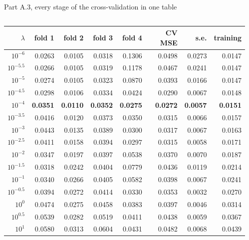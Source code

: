 \documentclass[10pt,aspectratio=169]{beamer}
\begin{document}
\begin{frame}{Part A.3, every stage of the cross-validation in one table}
\begin{columns}[T]
\begin{column}{0.66\textwidth}
\centering
{\fontsize{6.2}{7.0}\selectfont
\begin{tabular}{@{}rrrrrrrr@{}}
\toprule
$\lambda$ & fold 1 & fold 2 & fold 3 & fold 4 & CV MSE & s.e. & training \\
\midrule
$10^{-6}$ & 0.0263 & 0.0105 & 0.0318 & 0.1306 & 0.0498 & 0.0273 & 0.0147 \\
$10^{-5.5}$ & 0.0266 & 0.0105 & 0.0319 & 0.1178 & 0.0467 & 0.0241 & 0.0147 \\
$10^{-5}$ & 0.0274 & 0.0105 & 0.0323 & 0.0870 & 0.0393 & 0.0166 & 0.0147 \\
$10^{-4.5}$ & 0.0298 & 0.0106 & 0.0334 & 0.0424 & 0.0290 & 0.0067 & 0.0148 \\  %
\textbf{$10^{-4}$} & \textbf{0.0351} & \textbf{0.0110} & \textbf{0.0352} & \textbf{0.0275} & \textbf{0.0272} & \textbf{0.0057} & \textbf{0.0151} \\  %
$10^{-3.5}$ & 0.0416 & 0.0120 & 0.0373 & 0.0350 & 0.0315 & 0.0066 & 0.0157 \\  %
$10^{-3}$ & 0.0443 & 0.0135 & 0.0389 & 0.0300 & 0.0317 & 0.0067 & 0.0163 \\  %
$10^{-2.5}$ & 0.0411 & 0.0158 & 0.0394 & 0.0297 & 0.0315 & 0.0058 & 0.0171 \\  %
$10^{-2}$ & 0.0347 & 0.0197 & 0.0397 & 0.0538 & 0.0370 & 0.0070 & 0.0187 \\
$10^{-1.5}$ & 0.0318 & 0.0242 & 0.0404 & 0.0779 & 0.0436 & 0.0119 & 0.0214 \\
$10^{-1}$ & 0.0340 & 0.0266 & 0.0405 & 0.0582 & 0.0398 & 0.0067 & 0.0241 \\
$10^{-0.5}$ & 0.0394 & 0.0272 & 0.0414 & 0.0330 & 0.0353 & 0.0032 & 0.0270 \\
$10^{0}$ & 0.0474 & 0.0275 & 0.0458 & 0.0383 & 0.0397 & 0.0046 & 0.0314 \\
$10^{0.5}$ & 0.0539 & 0.0282 & 0.0519 & 0.0411 & 0.0438 & 0.0059 & 0.0367 \\
$10^{1}$ & 0.0580 & 0.0313 & 0.0604 & 0.0431 & 0.0482 & 0.0068 & 0.0439 \\
\bottomrule
\end{tabular}
}
\end{column}
\begin{column}{0.32\textwidth}
\scriptsize

\end{column}
\end{columns}
\end{frame}
\end{document}
